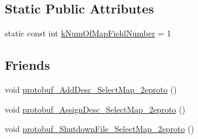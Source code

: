 \subsection*{Static Public Attributes}
\begin{DoxyCompactItemize}
\item 
static const int \hyperlink{class_select_map_a82d1599ce39896be4446fdc47fd087b4}{k\-Num\-Of\-Map\-Field\-Number} = 1
\end{DoxyCompactItemize}
\subsection*{Friends}
\begin{DoxyCompactItemize}
\item 
void \hyperlink{class_select_map_aad2611d2dc5aa84e66de3ab9abaa4b62}{protobuf\-\_\-\-Add\-Desc\-\_\-\-Select\-Map\-\_\-2eproto} ()
\item 
void \hyperlink{class_select_map_af70cd852226b57cecb6d29ffbb5455af}{protobuf\-\_\-\-Assign\-Desc\-\_\-\-Select\-Map\-\_\-2eproto} ()
\item 
void \hyperlink{class_select_map_a84edfc241ea5eb06701606ff9426e996}{protobuf\-\_\-\-Shutdown\-File\-\_\-\-Select\-Map\-\_\-2eproto} ()
\end{DoxyCompactItemize}


